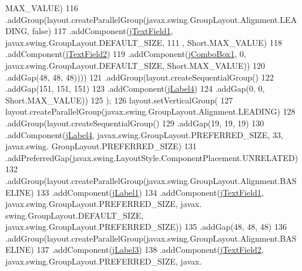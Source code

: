 \begin{DoxyCode}
      MAX\_VALUE)
116                         .addGroup(layout.createParallelGroup(javax.swing.GroupLayout.Alignment.LEADING, \textcolor{keyword}{
      false})
117                             .addComponent(\mbox{\hyperlink{classejercicio2_1_1_camion_interfaz_ac094ecbee7fcbad6cf54f57cceb73bdb}{jTextField1}}, javax.swing.GroupLayout.DEFAULT\_SIZE, 111
      , Short.MAX\_VALUE)
118                             .addComponent(\mbox{\hyperlink{classejercicio2_1_1_camion_interfaz_a08c1f3dc1cf2e8d6f09958c97ecdcd6e}{jTextField2}})
119                             .addComponent(\mbox{\hyperlink{classejercicio2_1_1_camion_interfaz_ad99726150fad438267d353b48c6aaf7d}{jComboBox1}}, 0, javax.swing.GroupLayout.DEFAULT\_SIZE, 
      Short.MAX\_VALUE))
120                         .addGap(48, 48, 48))))
121             .addGroup(layout.createSequentialGroup()
122                 .addGap(151, 151, 151)
123                 .addComponent(\mbox{\hyperlink{classejercicio2_1_1_camion_interfaz_a4a08e18cef32cc5cc683a2d882e3fdcb}{jLabel4}})
124                 .addGap(0, 0, Short.MAX\_VALUE))
125         );
126         layout.setVerticalGroup(
127             layout.createParallelGroup(javax.swing.GroupLayout.Alignment.LEADING)
128             .addGroup(layout.createSequentialGroup()
129                 .addGap(19, 19, 19)
130                 .addComponent(\mbox{\hyperlink{classejercicio2_1_1_camion_interfaz_a4a08e18cef32cc5cc683a2d882e3fdcb}{jLabel4}}, javax.swing.GroupLayout.PREFERRED\_SIZE, 33, javax.swing.
      GroupLayout.PREFERRED\_SIZE)
131                 .addPreferredGap(javax.swing.LayoutStyle.ComponentPlacement.UNRELATED)
132                 .addGroup(layout.createParallelGroup(javax.swing.GroupLayout.Alignment.BASELINE)
133                     .addComponent(\mbox{\hyperlink{classejercicio2_1_1_camion_interfaz_a490011dc597ba9415392ffbe2ad78bce}{jLabel1}})
134                     .addComponent(\mbox{\hyperlink{classejercicio2_1_1_camion_interfaz_ac094ecbee7fcbad6cf54f57cceb73bdb}{jTextField1}}, javax.swing.GroupLayout.PREFERRED\_SIZE, javax.
      swing.GroupLayout.DEFAULT\_SIZE, javax.swing.GroupLayout.PREFERRED\_SIZE))
135                 .addGap(48, 48, 48)
136                 .addGroup(layout.createParallelGroup(javax.swing.GroupLayout.Alignment.BASELINE)
137                     .addComponent(\mbox{\hyperlink{classejercicio2_1_1_camion_interfaz_a13844a46462d16486b33610dc0c6bb47}{jLabel3}})
138                     .addComponent(\mbox{\hyperlink{classejercicio2_1_1_camion_interfaz_a08c1f3dc1cf2e8d6f09958c97ecdcd6e}{jTextField2}}, javax.swing.GroupLayout.PREFERRED\_SIZE, javax.

\end{DoxyCode}
